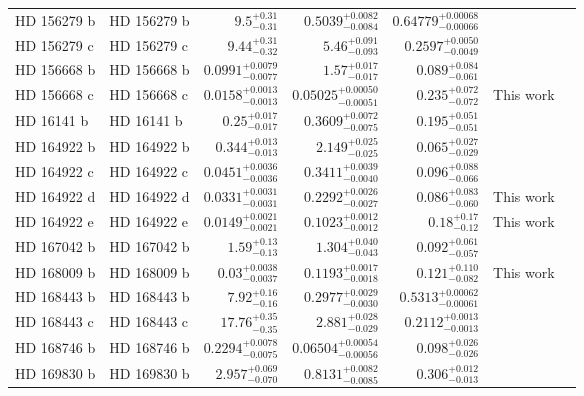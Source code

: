 \begin{longtable*}{llrrrrr}
HD 156279 b & HD 156279 b & $9.5^{+0.31}_{-0.31}$ & $0.5039^{+0.0082}_{-0.0084}$ & $0.64779^{+0.00068}_{-0.00066}$ & \cite{Diaz12} & \\ 
HD 156279 c & HD 156279 c & $9.44^{+0.31}_{-0.32}$ & $5.46^{+0.091}_{-0.093}$ & $0.2597^{+0.0050}_{-0.0049}$ & \cite{Bryan16} & \\ 
HD 156668 b & HD 156668 b & $0.0991^{+0.0079}_{-0.0077}$ & $1.57^{+0.017}_{-0.017}$ & $0.089^{+0.084}_{-0.061}$ & \cite{Howard11} & \\ 
HD 156668 c & HD 156668 c & $0.0158^{+0.0013}_{-0.0013}$ & $0.05025^{+0.00050}_{-0.00051}$ & $0.235^{+0.072}_{-0.072}$ & This work & \\ 
HD 16141 b & HD 16141 b & $0.25^{+0.017}_{-0.017}$ & $0.3609^{+0.0072}_{-0.0075}$ & $0.195^{+0.051}_{-0.051}$ & \cite{Butler06} & \\ 
HD 164922 b & HD 164922 b & $0.344^{+0.013}_{-0.013}$ & $2.149^{+0.025}_{-0.025}$ & $0.065^{+0.027}_{-0.029}$ & \cite{Butler06} & \\ 
HD 164922 c & HD 164922 c & $0.0451^{+0.0036}_{-0.0036}$ & $0.3411^{+0.0039}_{-0.0040}$ & $0.096^{+0.088}_{-0.066}$ & \cite{Fulton16} & \\ 
HD 164922 d & HD 164922 d & $0.0331^{+0.0031}_{-0.0031}$ & $0.2292^{+0.0026}_{-0.0027}$ & $0.086^{+0.083}_{-0.060}$ & This work & \\ 
HD 164922 e & HD 164922 e & $0.0149^{+0.0021}_{-0.0021}$ & $0.1023^{+0.0012}_{-0.0012}$ & $0.18^{+0.17}_{-0.12}$ & This work & \\ 
HD 167042 b & HD 167042 b & $1.59^{+0.13}_{-0.13}$ & $1.304^{+0.040}_{-0.043}$ & $0.092^{+0.061}_{-0.057}$ & \cite{Johnson08} & \\ 
HD 168009 b & HD 168009 b & $0.03^{+0.0038}_{-0.0037}$ & $0.1193^{+0.0017}_{-0.0018}$ & $0.121^{+0.110}_{-0.082}$ & This work & \\ 
HD 168443 b & HD 168443 b & $7.92^{+0.16}_{-0.16}$ & $0.2977^{+0.0029}_{-0.0030}$ & $0.5313^{+0.00062}_{-0.00061}$ & \cite{Wittenmyer07} & \\ 
HD 168443 c & HD 168443 c & $17.76^{+0.35}_{-0.35}$ & $2.881^{+0.028}_{-0.029}$ & $0.2112^{+0.0013}_{-0.0013}$ & \cite{Wittenmyer07} & \\ 
HD 168746 b & HD 168746 b & $0.2294^{+0.0078}_{-0.0075}$ & $0.06504^{+0.00054}_{-0.00056}$ & $0.098^{+0.026}_{-0.026}$ & \cite{Pepe02} & \\ 
HD 169830 b & HD 169830 b & $2.957^{+0.069}_{-0.070}$ & $0.8131^{+0.0082}_{-0.0085}$ & $0.306^{+0.012}_{-0.013}$ & \cite{Naef01} & \\ 

\end{longtable*}
